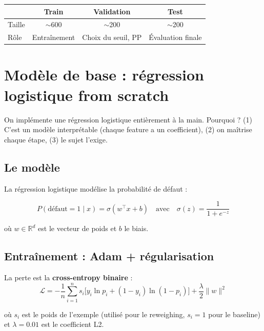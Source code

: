 \documentclass[11pt, a4paper]{article}
\begin{document}
\begin{table}[H]
\centering
\begin{tabular}{lccc}
\toprule
& \textbf{Train} & \textbf{Validation} & \textbf{Test} \\
\midrule
Taille & $\sim$600 & $\sim$200 & $\sim$200 \\
R\^{o}le & Entra\^{i}nement & Choix du seuil, PP & \'{E}valuation finale \\
\bottomrule
\end{tabular}
\end{table}

\section{Mod\`{e}le de base : r\'{e}gression logistique from scratch}
\label{sec:model}

\begin{questionbox}
On impl\'{e}mente une r\'{e}gression logistique enti\`{e}rement \`{a} la main. Pourquoi ? (1) C'est un mod\`{e}le interpr\'{e}table (chaque feature a un coefficient), (2) on ma\^{i}trise chaque \'{e}tape, (3) le sujet l'exige.
\end{questionbox}

\subsection{Le mod\`{e}le}

La r\'{e}gression logistique mod\'{e}lise la probabilit\'{e} de d\'{e}faut :

$$P(\text{d\'{e}faut}=1 \mid x) = \sigma(w^\top x + b) \quad \text{avec} \quad \sigma(z) = \frac{1}{1 + e^{-z}}$$

\noindent o\`{u} $w \in \mathbb{R}^d$ est le vecteur de poids et $b$ le biais.

\subsection{Entra\^{i}nement : Adam + r\'{e}gularisation}

La perte est la \textbf{cross-entropy binaire} :
$$\mathcal{L} = -\frac{1}{n}\sum_{i=1}^{n} s_i \Big[ y_i \ln p_i + (1-y_i) \ln(1 - p_i) \Big] + \frac{\lambda}{2} \|w\|^2$$

\noindent o\`{u} $s_i$ est le poids de l'exemple (utilis\'{e} pour le reweighing, $s_i = 1$ pour le baseline) et $\lambda = 0.01$ est le coefficient L2.
\end{document}
